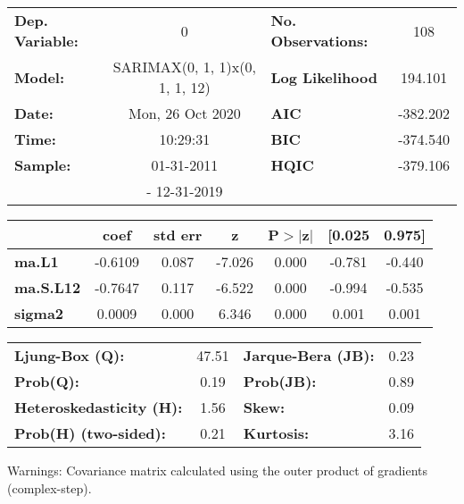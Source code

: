 \begin{center}
\begin{tabular}{lclc}
\toprule
\textbf{Dep. Variable:}          &               0                & \textbf{  No. Observations:  } &    108      \\
\textbf{Model:}                  & SARIMAX(0, 1, 1)x(0, 1, 1, 12) & \textbf{  Log Likelihood     } &  194.101    \\
\textbf{Date:}                   &        Mon, 26 Oct 2020        & \textbf{  AIC                } &  -382.202   \\
\textbf{Time:}                   &            10:29:31            & \textbf{  BIC                } &  -374.540   \\
\textbf{Sample:}                 &           01-31-2011           & \textbf{  HQIC               } &  -379.106   \\
\textbf{}                        &          - 12-31-2019          & \textbf{                     } &             \\
\bottomrule
\end{tabular}
\begin{tabular}{lcccccc}
                  & \textbf{coef} & \textbf{std err} & \textbf{z} & \textbf{P$> |$z$|$} & \textbf{[0.025} & \textbf{0.975]}  \\
\midrule
\textbf{ma.L1}    &      -0.6109  &        0.087     &    -7.026  &         0.000        &       -0.781    &       -0.440     \\
\textbf{ma.S.L12} &      -0.7647  &        0.117     &    -6.522  &         0.000        &       -0.994    &       -0.535     \\
\textbf{sigma2}   &       0.0009  &        0.000     &     6.346  &         0.000        &        0.001    &        0.001     \\
\bottomrule
\end{tabular}
\begin{tabular}{lclc}
\textbf{Ljung-Box (Q):}          & 47.51 & \textbf{  Jarque-Bera (JB):  } & 0.23  \\
\textbf{Prob(Q):}                &  0.19 & \textbf{  Prob(JB):          } & 0.89  \\
\textbf{Heteroskedasticity (H):} &  1.56 & \textbf{  Skew:              } & 0.09  \\
\textbf{Prob(H) (two-sided):}    &  0.21 & \textbf{  Kurtosis:          } & 3.16  \\
\bottomrule
\end{tabular}
\end{center}

Warnings: \newline
 [1] Covariance matrix calculated using the outer product of gradients (complex-step).